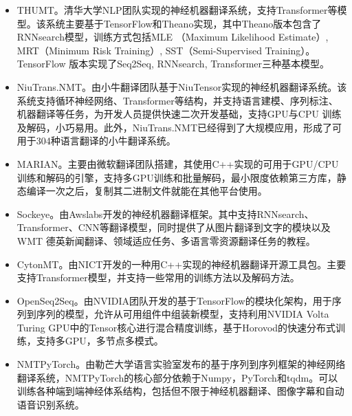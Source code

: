 \begin{appendices}
\begin{itemize}
\item THUMT。清华大学NLP团队实现的神经机器翻译系统，支持Transformer等模型。该系统主要基于TensorFlow和Theano实现，其中Theano版本包含了RNNsearch模型，训练方式包括MLE （Maximum Likelihood Estimate）, MRT（Minimum Risk Training）, SST（Semi-Supervised Training）。TensorFlow 版本实现了Seq2Seq, RNNsearch, Transformer三种基本模型。
\vspace{0.5em}
\item NiuTrans.NMT。由小牛翻译团队基于NiuTensor实现的神经机器翻译系统。该系统支持循环神经网络、Transformer等结构，并支持语言建模、序列标注、机器翻译等任务，为开发人员提供快速二次开发基础，支持GPU与CPU 训练及解码，小巧易用。此外，NiuTrans.NMT已经得到了大规模应用，形成了可用于304种语言翻译的小牛翻译系统。
\vspace{0.5em}
\item MARIAN。主要由微软翻译团队搭建，其使用C++实现的可用于GPU/CPU训练和解码的引擎，支持多GPU训练和批量解码，最小限度依赖第三方库，静态编译一次之后，复制其二进制文件就能在其他平台使用。
\vspace{0.5em}
\item Sockeye。由Awslabs开发的神经机器翻译框架。其中支持RNNsearch、Transformer、CNN等翻译模型，同时提供了从图片翻译到文字的模块以及WMT 德英新闻翻译、领域适应任务、多语言零资源翻译任务的教程。
\vspace{0.5em}
\item CytonMT。由NICT开发的一种用C++实现的神经机器翻译开源工具包。主要支持Transformer模型，并支持一些常用的训练方法以及解码方法。
\vspace{0.5em}
\item OpenSeq2Seq。由NVIDIA团队开发的基于TensorFlow的模块化架构，用于序列到序列的模型，允许从可用组件中组装新模型，支持利用NVIDIA Volta Turing GPU中的Tensor核心进行混合精度训练，基于Horovod的快速分布式训练，支持多GPU，多节点多模式。
\vspace{0.5em}
\item NMTPyTorch。由勒芒大学语言实验室发布的基于序列到序列框架的神经网络翻译系统，NMTPyTorch的核心部分依赖于Numpy，PyTorch和tqdm。可以训练各种端到端神经体系结构，包括但不限于神经机器翻译、图像字幕和自动语音识别系统。
\vspace{0.5em}
\end{itemize}

\end{appendices}

